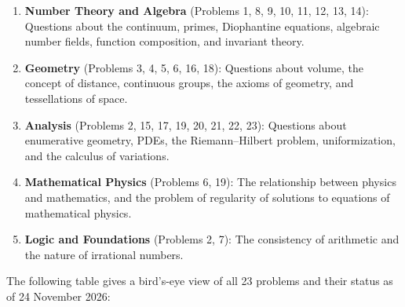 \begin{enumerate}
    \item \textbf{Number Theory and Algebra} (Problems 1, 8, 9, 10, 11, 12, 13, 14): Questions about the continuum, primes, Diophantine equations, algebraic number fields, function composition, and invariant theory.

    \item \textbf{Geometry} (Problems 3, 4, 5, 6, 16, 18): Questions about volume, the concept of distance, continuous groups, the axioms of geometry, and tessellations of space.

    \item \textbf{Analysis} (Problems 2, 15, 17, 19, 20, 21, 22, 23): Questions about enumerative geometry, PDEs, the Riemann--Hilbert problem, uniformization, and the calculus of variations.

    \item \textbf{Mathematical Physics} (Problems 6, 19): The relationship between physics and mathematics, and the problem of regularity of solutions to equations of mathematical physics.

    \item \textbf{Logic and Foundations} (Problems 2, 7): The consistency of arithmetic and the nature of irrational numbers.
\end{enumerate}

The following table gives a bird's-eye view of all 23 problems and their status as of 24 November 2026:

